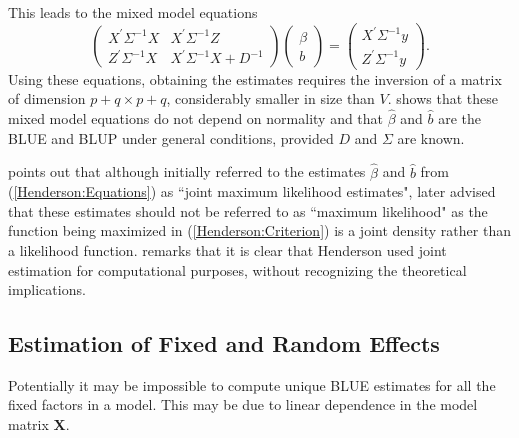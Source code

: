 \documentclass[12pt, a4paper]{report}
\theoremstyle{plain}
\theoremstyle{definition}
\theoremstyle{remark}
\begin{document}
	This leads to the mixed model equations
	\begin{equation}
	\left(\begin{array}{cc}
	X^\prime\Sigma^{-1}X & X^\prime\Sigma^{-1}Z
	\\
	Z^\prime\Sigma^{-1}X & X^\prime\Sigma^{-1}X + D^{-1}
	\end{array}\right)
	\left(\begin{array}{c}
	\beta \\
	b
	\end{array}\right)
	=
	\left(\begin{array}{c}
	X^\prime\Sigma^{-1}y \\
	Z^\prime\Sigma^{-1}y
	\end{array}\right).
	\label{Henderson:Equations}
	\end{equation}
	Using these equations, obtaining the estimates requires the inversion of a matrix
	of dimension $p+q \times p+q$, considerably smaller in size than $V$. \citet{Henderson63} shows that these mixed model equations do not depend on normality and that $\hat{\beta}$ and $\hat{b}$ are the BLUE and BLUP under general conditions, provided $D$ and $\Sigma$ are known.
	
	\cite{Robi:BLUP:1991} points out that although \cite{Henderson:1950} initially referred to the estimates $\hat{\beta}$ and $\hat{b}$ from (\ref{Henderson:Equations}) as ``joint maximum likelihood estimates", \cite{Henderson:1973} later advised that these estimates should not be referred to as ``maximum likelihood" as the function being maximized in (\ref{Henderson:Criterion}) is a joint density rather than a likelihood function. \cite{Lee:Neld:Pawi:2006} remarks that it is clear that Henderson used joint estimation for computational purposes, without recognizing the theoretical implications.
	

	\subsection{Estimation of Fixed and Random Effects}
		Potentially it may be impossible to compute unique BLUE estimates for all the fixed factors in a model. This may be due to linear dependence in the model
		matrix \textbf{X}. 
		
\end{document}
